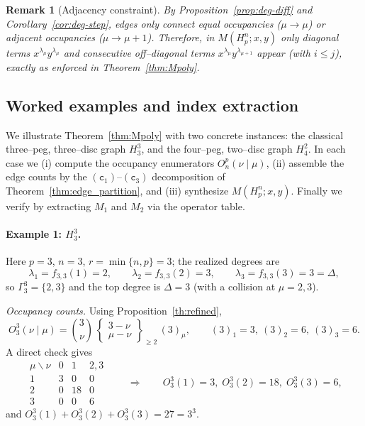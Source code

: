 \documentclass[letterpaper,12pt]{article}
\newtheorem{remark}{Remark}
\begin{document}
\begin{remark}[Adjacency constraint]
     By Proposition~\ref{prop:deg-diff} and Corollary~\ref{cor:deg-step},
edges only connect equal occupancies ($\mu\to\mu$) or \emph{adjacent} occupancies ($\mu\to\mu+1$).
Therefore, in $M(H_p^n;x,y)$ only diagonal terms $x^{\lambda_\mu}y^{\lambda_\mu}$ and consecutive off–diagonal terms
$x^{\lambda_\mu}y^{\lambda_{\mu+1}}$ appear (with $i\le j$), exactly as enforced in Theorem~\ref{thm:Mpoly}.
\end{remark}


\subsection*{Worked examples and index extraction}

We illustrate Theorem~\ref{thm:Mpoly} with two concrete instances: the classical three–peg,
three–disc graph $H_3^3$, and the four–peg, two–disc graph $H_4^2$. In each case we (i) compute
the occupancy enumerators $O_n^p(\nu\mid\mu)$, (ii) assemble the edge counts by the
$(\texttt{c}_{1})$--$(\texttt{c}_{3})$ decomposition of Theorem~\ref{thm:edge_partition}, and (iii) synthesize
$M(H_p^n;x,y)$. Finally we verify by extracting $M_1$ and $M_2$ via the operator table.

\paragraph{Example 1: $H_3^3$.}
Here $p=3$, $n=3$, $r=\min\{n,p\}=3$; the realized degrees are
\[
\lambda_1=f_{3,3}(1)=2,\qquad
\lambda_2=f_{3,3}(2)=3,\qquad
\lambda_3=f_{3,3}(3)=3=\Delta,
\]
so $\Gamma_3^3=\{2,3\}$ and the top degree is $\Delta=3$ (with a collision at $\mu=2,3$).

\emph{Occupancy counts.}
Using Proposition~\ref{th:refined},
\[
O_3^3(\nu\mid\mu)=\binom{3}{\nu}\,
\begin{Bmatrix} 3-\nu \\ \mu-\nu \end{Bmatrix}_{\ge 2}\,
(3)_\mu,
\qquad (3)_1=3,\ (3)_2=6,\ (3)_3=6.
\]
A direct check gives
\[
\begin{array}{c|ccc}
\mu\backslash \nu & 0 & 1 & 2,3\\\hline
1 & 3 & 0 & 0\\
2 & 0 & 18 & 0\\
3 & 0 & 0 & 6
\end{array}
\qquad\Longrightarrow\qquad
O_3^3(1)=3,\; O_3^3(2)=18,\; O_3^3(3)=6,
\]
and $O_3^3(1)+O_3^3(2)+O_3^3(3)=27=3^3$.
\end{document}
